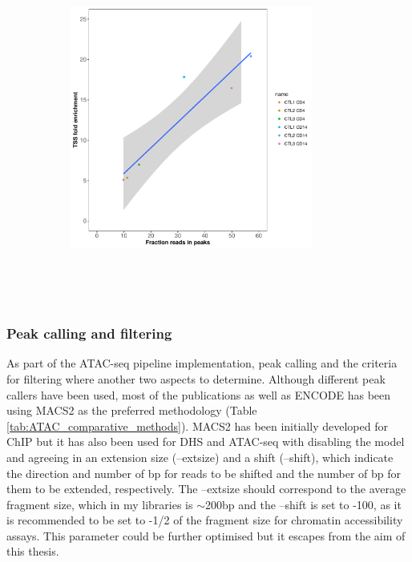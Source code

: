 \begin{figure}[htbp]
\begin{subfigure}{0.45\textwidth}
\caption{\textbf{}} %
\end{subfigure}%
\begin{subfigure}{0.45\textwidth}
\centering
\includegraphics[height=8cm,width=\textwidth]{./Results1/pdfs/ATAC_Core_fresh_CD4_CD14_corr_tss_vs_frac_reads_in_peaks}
\caption{\textbf{}} %
\end{subfigure} \\
\hfill
\caption[Measurements for quality control assessment in ATAC-seq samples]{\textbf{} \\
}
\label{fig:QC_ATAC}
\end{figure}
	

\subsubsection{Peak calling and filtering}
As part of the ATAC-seq pipeline implementation, peak calling and the criteria for filtering where another two aspects to determine.
Although different peak callers have been used, most of the publications as well as ENCODE has been using MACS2 as the preferred methodology (Table \ref{tab:ATAC_comparative_methods}). MACS2 has been initially developed for ChIP but it has also been used for DHS and ATAC-seq with disabling the model and agreeing in an extension size (--extsize) and a shift (--shift), which indicate the direction and number of bp for reads to be shifted and the number of bp for them to be extended, respectively. The --extsize should correspond to the average fragment size, which in my libraries is $\sim$200bp and the --shift is set to -100, as it is recommended to be set to -1/2 of the fragment size for chromatin accessibility assays. This parameter could be further optimised but it escapes from the aim of this thesis.

